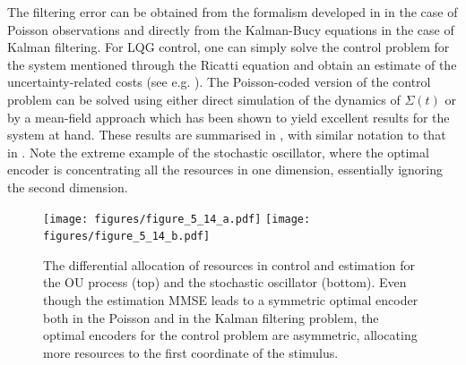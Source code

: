 The filtering error can be obtained from the formalism developed in  in the case of Poisson observations and directly from the Kalman-Bucy
equations in the case of Kalman filtering. For LQG control, one can simply solve the control problem for the system mentioned through the Ricatti equation and obtain an
estimate of the uncertainty-related costs (see e.g. ). The Poisson-coded version of the control problem can be solved using either direct simulation of the
dynamics of $\Sigma(t)$ or by a mean-field approach which has been shown to yield excellent results for the system at hand. These results are summarised in
, with similar notation to that in . Note the extreme example of the stochastic oscillator, where the optimal encoder
is concentrating all the resources in one dimension, essentially ignoring the second dimension.
\begin{figure}
\texttt{[image: figures/figure\_5\_14\_a.pdf]}
\texttt{[image: figures/figure\_5\_14\_b.pdf]}
\caption[Differential allocation of observation resources for estimation and control.]{{The differential allocation of resources in control and estimation for the OU process (top) and the stochastic oscillator (bottom). Even though the estimation MMSE leads to a symmetric optimal encoder both in the Poisson and in the Kalman filtering problem, the optimal encoders for the control problem are asymmetric, allocating more resources to the first coordinate of the stimulus.
}}
\label{fig:comparison_radial}
\end{figure}
